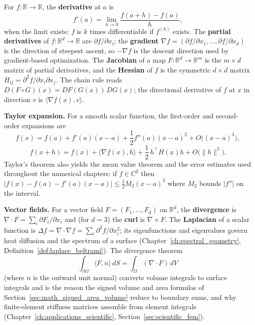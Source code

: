 For $f : \mathbb{R} \to \mathbb{R}$, the \textbf{derivative} at $a$ is
\[
  f'(a) = \lim_{h \to 0} \frac{f(a+h) - f(a)}{h},
\]
when the limit exists; $f$ is $k$ times differentiable if $f^{(k)}$ exists.
The \textbf{partial derivatives} of $f : \mathbb{R}^d \to \mathbb{R}$ are
$\partial f / \partial x_i$; the \textbf{gradient}
$\nabla f = (\partial f/\partial x_1, \dots, \partial f/\partial x_d)$ is the
direction of steepest ascent, so $-\nabla f$ is the descent direction used by
gradient-based optimization. The \textbf{Jacobian} of a map
$F : \mathbb{R}^d \to \mathbb{R}^m$ is the $m \times d$ matrix of partial
derivatives, and the \textbf{Hessian} of $f$ is the symmetric $d \times d$
matrix $H_{ij} = \partial^2 f / \partial x_i \partial x_j$. The chain rule
reads $D(F \circ G)(x) = DF(G(x))\, DG(x)$; the directional derivative of $f$
at $x$ in direction $v$ is $\langle \nabla f(x), v \rangle$.

\textbf{Taylor expansion.}
For a smooth scalar function, the first-order and second-order expansions are
\[
  f(x) = f(a) + f'(a)(x-a) + \frac{1}{2} f''(a)(x-a)^2 + O\bigl((x-a)^3\bigr),
\]
\[
  f(x + h) = f(x) + \langle \nabla f(x), h\rangle
    + \frac{1}{2}\, h^\top H(x) h + O\bigl(\|h\|^3\bigr).
\]
Taylor's theorem also yields the mean value theorem and the error estimates
used throughout the numerical chapters: if $f \in C^2$ then
$|f(x) - f(a) - f'(a)(x-a)| \le \tfrac{1}{2} M_2 (x-a)^2$ where $M_2$ bounds
$|f''|$ on the interval.

\medskip
\noindent\textbf{Vector fields.}
For a vector field $F = (F_1,\dots,F_d)$ on $\mathbb{R}^d$, the
\textbf{divergence} is $\nabla \cdot F = \sum_i \partial F_i/\partial x_i$
and (for $d = 3$) the \textbf{curl} is
$\nabla \times F$. The \textbf{Laplacian} of a scalar function is
$\Delta f = \nabla \cdot \nabla f = \sum_i \partial^2 f/\partial x_i^2$; its
eigenfunctions and eigenvalues govern heat diffusion and the spectrum of a
surface (Chapter~\ref{ch:spectral_geometry}, Definition~\ref{def:laplace_beltrami}).
The divergence theorem
\[
  \int_{\partial \Omega} \langle F, n\rangle \, dS = \int_\Omega (\nabla \cdot F)\, dV
\]
(where $n$ is the outward unit normal) converts volume integrals to surface
integrals and is the reason the signed volume and area formulas of
Section~\ref{sec:math_signed_area_volume} reduce to boundary sums, and why
finite-element stiffness matrices assemble from element integrals
(Chapter~\ref{ch:applications_scientific}, Section~\ref{sec:scientific_fem}).

